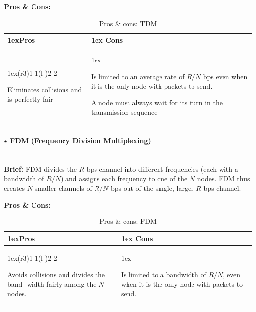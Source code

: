 \vspace{1em}
\noindent \textbf{Pros \& Cons:}
\begin{table}[H]
    \begin{tabularx}{\linewidth}{>{\parskip1ex}X@{\kern4\tabcolsep}>{\parskip1ex}X}
    \toprule
    \hfil\bfseries Pros
    &
    \hfil\bfseries Cons 
    \\\cmidrule(r{3\tabcolsep}){1-1}\cmidrule(l{-\tabcolsep}){2-2}
    
    Eliminates collisions and is perfectly fair 
    &
    
    Is limited to an average rate of $R/N$ bps even when it is the only node with packets to send.\par
    A node must always wait for its turn in the transmission sequence
    \\\bottomrule
    \end{tabularx}
    \caption{Pros \& cons: TDM}
\end{table}

\paragraph[5.3.1.2 FDM]{$\pmb{\star}$ FDM (Frequency Division Multiplexing)}\mbox{}\\[4pt]
\noindent \textbf{Brief:} FDM divides the $R$ bps channel into different frequencies (each with a bandwidth of $R/N$) and assigns each frequency to one of the $N$ nodes. FDM thus creates $N$ smaller channels of $R/N$ bps out of the single, larger $R$ bps channel.

\vspace{1em}
\noindent \textbf{Pros \& Cons:}
\begin{table}[H]
    \begin{tabularx}{\linewidth}{>{\parskip1ex}X@{\kern4\tabcolsep}>{\parskip1ex}X}
    \toprule
    \hfil\bfseries Pros
    &
    \hfil\bfseries Cons 
    \\\cmidrule(r{3\tabcolsep}){1-1}\cmidrule(l{-\tabcolsep}){2-2}
    
    Avoids collisions and divides the band- width fairly among the $N$ nodes.
    &
    
    Is limited to a bandwidth of $R/N$, even when it is the only node with packets to send.
    \\\bottomrule
    \end{tabularx}
    \caption{Pros \& cons: FDM}
\end{table}
